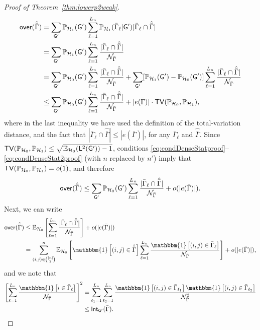 \documentclass[12pt]{article}
\newcommand{\bE}{\mathbb{E}}
\newcommand{\Ind}{\mathbbm{1}}
\newcommand {\pr} {\mathbb{P}}
\newcommand{\calH}{{\cal H}}
\newcommand{\calN}{{\cal N}}
\newcommand{\pp}[1]{\left[#1\right]}
\newcommand{\s}[1]{\mathsf{#1}}
\begin{document}
\begin{proof}[Proof of Theorem~\ref{thm:lowerp2weak}]
\begin{align}
\s{over}(\hat{\bar\Gamma}) &= \sum_{\s{G}'}\pr_{\calH_1}(\s{G}')\sum_{\ell=1}^{L_n}\pr_{\calH_1}(\bar{\Gamma}_\ell\vert\s{G}')|\bar{\Gamma}_\ell\cap\hat{\bar\Gamma}|\\
& = \sum_{\s{G}'}\pr_{\calH_1}(\s{G}')\sum_{\ell=1}^{L_n}\frac{|\bar{\Gamma}_\ell\cap\hat{\bar\Gamma}|}{\calN_{\bar\Gamma}}\\
& = \sum_{\s{G}'}\pr_{\calH_0}(\s{G}')\sum_{\ell=1}^{L_n}\frac{|\bar{\Gamma}_\ell\cap\hat{\bar\Gamma}|}{\calN_{\bar\Gamma}}+\sum_{\s{G}'}[\pr_{\calH_1}(\s{G}')-\pr_{\calH_0}(\s{G}')]\sum_{\ell=1}^{L_n}\frac{|\bar{\Gamma}_\ell\cap\hat{\bar\Gamma}|}{\calN_{\bar\Gamma}}\\
&\leq \sum_{\s{G}'}\pr_{\calH_0}(\s{G}')\sum_{\ell=1}^{L_n}\frac{|\bar{\Gamma}_\ell\cap\hat{\bar\Gamma}|}{\calN_{\bar\Gamma}}+|e(\bar\Gamma)|\cdot\s{TV}(\pr_{\calH_0},\pr_{\calH_1}),
\end{align}
where in the last inequality we have used the definition of the total-variation distance, and the fact that $|\bar{\Gamma}_\ell\cap\hat{\bar\Gamma}|\leq |e(\bar\Gamma)|$, for any $\bar{\Gamma}_\ell$ and $\hat{\bar\Gamma}$. Since $\s{TV}(\pr_{\calH_0},\pr_{\calH_1})\leq\sqrt{\bE_{\calH_0}(\s{L}^2(\s{G}'))-1}$, conditions \eqref{eq:condDenseStatproof}--\eqref{eq:condDenseStat2proof} (with $n$ replaced by $n'$) imply that $\s{TV}(\pr_{\calH_0},\pr_{\calH_1}) = o(1)$, and therefore
\begin{align}
\s{over}(\hat{\bar\Gamma})\leq \sum_{\s{G}'}\pr_{\calH_0}(\s{G}')\sum_{\ell=1}^{L_n}\frac{|\bar{\Gamma}_\ell\cap\hat{\bar\Gamma}|}{\calN_{\bar\Gamma}}+o(|e(\bar\Gamma)|).
\end{align}
Next, we can write
\begin{align}
\s{over}(\hat{\bar\Gamma})&\leq \bE_{\calH_0}\pp{\sum_{\ell=1}^{L_n}\frac{|\bar{\Gamma}_\ell\cap\hat{\bar\Gamma}|}{\calN_{\bar\Gamma}}}+o(|e(\bar\Gamma)|)\\
& = \sum_{(i,j)\in\binom{[n]}{2}}^n\bE_{\calH_0}\pp{\Ind\pp{(i,j)\in\hat{\bar\Gamma}}\sum_{\ell=1}^{L_n}\frac{\Ind\pp{(i,j)\in\bar{\Gamma}_\ell}}{\calN_{\bar\Gamma}}}+o(|e(\bar\Gamma)|),
\end{align}
and we note that
\begin{align}
\pp{\sum_{\ell=1}^{L_n}\frac{\Ind\pp{i\in\bar{\Gamma}_\ell}}{\calN_{\bar\Gamma}}}^2 &= \sum_{\ell_1=1}^{L_n}\sum_{\ell_2=1}^{L_n}\frac{\Ind\pp{(i,j)\in\bar{\Gamma}_{\ell_1}}\Ind\pp{(i,j)\in\bar{\Gamma}_{\ell_2}}}{\calN^2_{\bar\Gamma}}\\
&\leq \s{Int}_{\s{G}'}(\bar\Gamma).
\end{align}

\end{proof}
\end{document}
